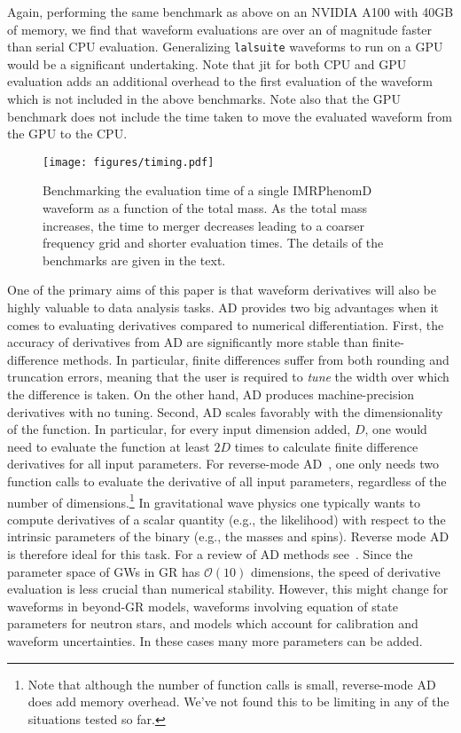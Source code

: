 \documentclass[twocolumn]{aastex631}
\newcommand{\lalsuite}{\texttt{lalsuite}\xspace}
\begin{document}
Again, performing the same benchmark as above on an NVIDIA A100 with 40GB of memory, we find that waveform evaluations are over an of magnitude faster than serial CPU evaluation.
Generalizing \lalsuite waveforms to run on a GPU would be a significant undertaking.
Note that jit for both CPU and GPU evaluation adds an additional overhead to the first evaluation of the waveform which is not included in the above benchmarks. 
Note also that the GPU benchmark does not include the time taken to move the evaluated waveform from the GPU to the CPU.

\begin{figure}[t]
	\begin{centering}
		\texttt{[image: figures/timing.pdf]}
		\caption{
			Benchmarking the evaluation time of a single IMRPhenomD waveform as a function of the total mass. As the total mass increases, the time to merger decreases leading to a coarser frequency grid and shorter evaluation times. The details of the benchmarks are given in the text.
        }
		\label{fig:timing}
	\end{centering}
\end{figure}

One of the primary aims of this paper is that waveform derivatives will also be highly valuable to data analysis tasks. 
AD provides two big advantages when it comes to evaluating derivatives compared to numerical differentiation.
First, the accuracy of derivatives from AD are significantly more stable than finite-difference methods.
In particular, finite differences suffer from both rounding and truncation errors, meaning that the user is required to \textit{tune} the width over which the difference is taken.
On the other hand, AD produces machine-precision derivatives with no tuning.
Second, AD scales favorably with the dimensionality of the function.
In particular, for every input dimension added, $D$, one would need to evaluate the function at least $2D$ times to calculate finite difference derivatives for all input parameters.
For reverse-mode AD~\citep{2018arXiv181105031M}, one only needs two function calls to evaluate the derivative of all input parameters, regardless of the number of dimensions.\footnote{
    Note that although the number of function calls is small, reverse-mode AD does add memory overhead.
    We've not found this to be limiting in any of the situations tested so far.
}
In gravitational wave physics one typically wants to compute derivatives of a scalar quantity (e.g., the likelihood) with respect to the intrinsic parameters of the binary (e.g., the masses and spins).
Reverse mode AD is therefore ideal for this task.
For a review of AD methods see~\cite{2018arXiv181105031M}.
Since the parameter space of GWs in GR has $\mathcal{O}(10)$ dimensions, the speed of derivative evaluation is less crucial than numerical stability.
However, this might change for waveforms in beyond-GR models, waveforms involving equation of state parameters for neutron stars, and models which account for calibration and waveform uncertainties.
In these cases many more parameters can be added.
\end{document}
